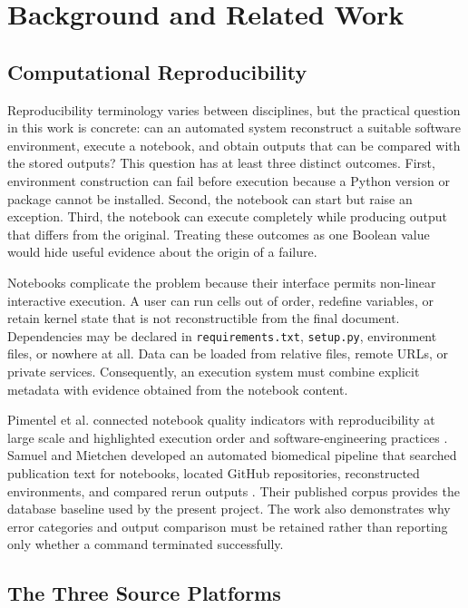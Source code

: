 \chapter{Background and Related Work}
\label{chap:background}

\section{Computational Reproducibility}

Reproducibility terminology varies between disciplines, but the practical question in this work is concrete: can an automated system reconstruct a suitable software environment, execute a notebook, and obtain outputs that can be compared with the stored outputs? This question has at least three distinct outcomes. First, environment construction can fail before execution because a Python version or package cannot be installed. Second, the notebook can start but raise an exception. Third, the notebook can execute completely while producing output that differs from the original. Treating these outcomes as one Boolean value would hide useful evidence about the origin of a failure.

Notebooks complicate the problem because their interface permits non-linear interactive execution. A user can run cells out of order, redefine variables, or retain kernel state that is not reconstructible from the final document. Dependencies may be declared in \texttt{requirements.txt}, \texttt{setup.py}, environment files, or nowhere at all. Data can be loaded from relative files, remote URLs, or private services. Consequently, an execution system must combine explicit metadata with evidence obtained from the notebook content.

Pimentel et al. connected notebook quality indicators with reproducibility at large scale and highlighted execution order and software-engineering practices \cite{pimentel2019}. Samuel and Mietchen developed an automated biomedical pipeline that searched publication text for notebooks, located GitHub repositories, reconstructed environments, and compared rerun outputs \cite{samuel2024computational}. Their published corpus provides the database baseline used by the present project. The work also demonstrates why error categories and output comparison must be retained rather than reporting only whether a command terminated successfully.

\section{The Three Source Platforms}

